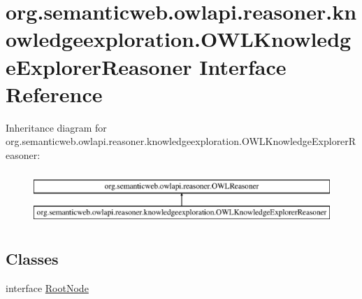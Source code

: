 \hypertarget{interfaceorg_1_1semanticweb_1_1owlapi_1_1reasoner_1_1knowledgeexploration_1_1_o_w_l_knowledge_explorer_reasoner}{\section{org.\-semanticweb.\-owlapi.\-reasoner.\-knowledgeexploration.\-O\-W\-L\-Knowledge\-Explorer\-Reasoner Interface Reference}
\label{interfaceorg_1_1semanticweb_1_1owlapi_1_1reasoner_1_1knowledgeexploration_1_1_o_w_l_knowledge_explorer_reasoner}
}
Inheritance diagram for org.\-semanticweb.\-owlapi.\-reasoner.\-knowledgeexploration.\-O\-W\-L\-Knowledge\-Explorer\-Reasoner\-:\begin{figure}[H]
\begin{center}
\leavevmode
\includegraphics[height=2.000000cm]{interfaceorg_1_1semanticweb_1_1owlapi_1_1reasoner_1_1knowledgeexploration_1_1_o_w_l_knowledge_explorer_reasoner}
\end{center}
\end{figure}
\subsection*{Classes}
\begin{DoxyCompactItemize}
\item 
interface \hyperlink{interfaceorg_1_1semanticweb_1_1owlapi_1_1reasoner_1_1knowledgeexploration_1_1_o_w_l_knowledge_explorer_reasoner_1_1_root_node}{Root\-Node}
\end{DoxyCompactItemize}
